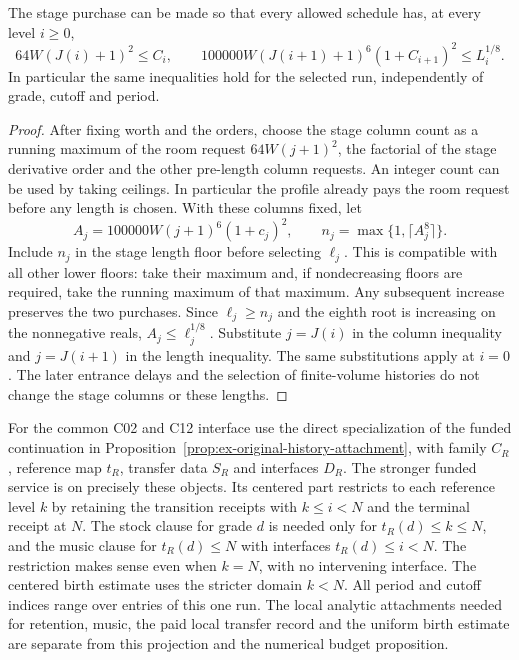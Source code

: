 \begin{proposition}
\label{prop:ex-stored-service-budget}
The stage purchase can be made so that every allowed schedule has,
at every level $i\geq0$,
\[
 64 W(J(i)+1)^2\le C_i,\qquad
 100000 W(J(i+1)+1)^6(1+C_{i+1})^2\le L_i^{1/8}.
\]
In particular the same inequalities hold for the selected run,
independently of grade, cutoff and period.
\end{proposition}

\begin{proof}
After fixing worth and the orders, choose the stage column count
as a running maximum of the room request $64W(j+1)^2$, the
factorial of the stage derivative order and the other pre-length
column requests. An integer count can be used by taking ceilings.
In particular the profile already pays the room request before any
length is chosen. With these columns fixed, let
\[
 A_j=100000W(j+1)^6(1+c_j)^2,\qquad
 n_j=\max\{1,\lceil A_j^8\rceil\}.
\]
Include $n_j$ in the stage length floor before selecting $\ell_j$.
This is compatible with all other lower floors: take their maximum
and, if nondecreasing floors are required, take the running maximum
of that maximum. Any subsequent increase preserves the two
purchases. Since $\ell_j\ge n_j$ and the eighth root is increasing
on the nonnegative reals, $A_j\le\ell_j^{1/8}$. Substitute $j=J(i)$
in the column inequality and $j=J(i+1)$ in the length inequality.
The same substitutions apply at $i=0$. The later entrance delays
and the selection of finite-volume histories do not change the
stage columns or these lengths.
\end{proof}

For the common C02 and C12 interface use the direct specialization
of the funded continuation in
Proposition~\ref{prop:ex-original-history-attachment}, with family
$C_R$, reference map $t_R$, transfer data $S_R$ and interfaces $D_R$.
The stronger funded service is on precisely these objects. Its
centered part restricts to each reference level $k$ by retaining
the transition receipts with $k\le i<N$ and the terminal receipt
at $N$. The stock clause for grade $d$ is needed only for
$t_R(d)\le k\le N$, and the music clause for $t_R(d)\le N$ with
interfaces $t_R(d)\le i<N$. The restriction makes sense even when
$k=N$, with no intervening interface. The centered birth estimate uses
the stricter domain $k<N$. All period and cutoff indices range
over entries of this one run. The local analytic attachments
needed for retention, music, the paid local transfer record and the uniform
birth estimate are separate from this projection and the numerical
budget proposition.

